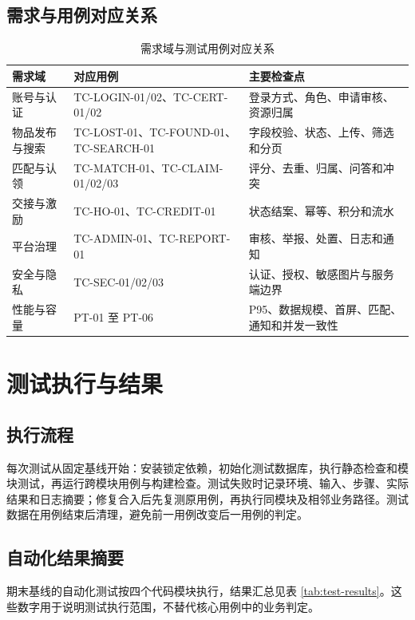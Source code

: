 \subsection{需求与用例对应关系}

\begin{table}[H]
  \centering
  \caption{需求域与测试用例对应关系}
  \begin{tabularx}{\textwidth}{L{3.2cm}L{5.1cm}Y}
    \toprule
    需求域 & 对应用例 & 主要检查点 \\
    \midrule
    账号与认证 & TC-LOGIN-01/02、TC-CERT-01/02 & 登录方式、角色、申请审核、资源归属 \\
    物品发布与搜索 & TC-LOST-01、TC-FOUND-01、TC-SEARCH-01 & 字段校验、状态、上传、筛选和分页 \\
    匹配与认领 & TC-MATCH-01、TC-CLAIM-01/02/03 & 评分、去重、归属、问答和冲突 \\
    交接与激励 & TC-HO-01、TC-CREDIT-01 & 状态结案、幂等、积分和流水 \\
    平台治理 & TC-ADMIN-01、TC-REPORT-01 & 审核、举报、处置、日志和通知 \\
    安全与隐私 & TC-SEC-01/02/03 & 认证、授权、敏感图片与服务端边界 \\
    性能与容量 & PT-01 至 PT-06 & P95、数据规模、首屏、匹配、通知和并发一致性 \\
    \bottomrule
  \end{tabularx}
\end{table}

\section{测试执行与结果}

\subsection{执行流程}

每次测试从固定基线开始：安装锁定依赖，初始化测试数据库，执行静态检查和模块测试，再运行跨模块用例与构建检查。测试失败时记录环境、输入、步骤、实际结果和日志摘要；修复合入后先复测原用例，再执行同模块及相邻业务路径。测试数据在用例结束后清理，避免前一用例改变后一用例的判定。

\subsection{自动化结果摘要}

期末基线的自动化测试按四个代码模块执行，结果汇总见表 \ref{tab:test-results}。这些数字用于说明测试执行范围，不替代核心用例中的业务判定。

